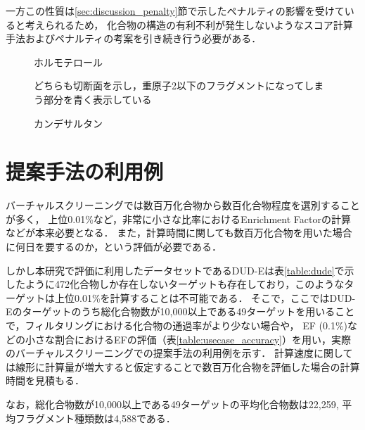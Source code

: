 一方この性質は\ref{sec:discussion_penalty}節で示したペナルティの影響を受けていると考えられるため，
化合物の構造の有利不利が発生しないようなスコア計算手法およびペナルティの考案を引き続き行う必要がある．

\begin{figure}[t]
\begin{minipage}{0.5\hsize}
 \begin{center}
  \caption{ホルモテロール}
  \label{fig:ZINC02599970}
 \end{center}
\end{minipage}
\begin{minipage}{0.5\hsize}
 \begin{center}
  \caption{カンデサルタン}
  \label{fig:ZINC03782818}
 \end{center}
\end{minipage}
\begin{center}
どちらも切断面を示し，重原子2以下のフラグメントになってしまう部分を青く表示している
\end{center}
\end{figure}


\section{提案手法の利用例}
バーチャルスクリーニングでは数百万化合物から数百化合物程度を選別することが多く\cite{Pulla2015, ShirgahiTalari2015}，
上位0.01\%など，非常に小さな比率におけるEnrichment Factorの計算などが本来必要となる．
また，計算時間に関しても数百万化合物を用いた場合に何日を要するのか，という評価が必要である．

しかし本研究で評価に利用したデータセットであるDUD-Eは表\ref{table:dude}で示したように472化合物しか存在しないターゲットも存在しており，このようなターゲットは上位0.01\%を計算することは不可能である．
そこで，ここではDUD-Eのターゲットのうち総化合物数が10,000以上である49ターゲットを用いることで，フィルタリングにおける化合物の通過率がより少ない場合や，
EF (0.1\%)などの小さな割合におけるEFの評価（表\ref{table:usecase_accuracy}）を用い，実際のバーチャルスクリーニングでの提案手法の利用例を示す．
計算速度に関しては線形に計算量が増大すると仮定することで数百万化合物を評価した場合の計算時間を見積もる．

なお，総化合物数が10,000以上である49ターゲットの平均化合物数は22,259, 平均フラグメント種類数は4,588である．

